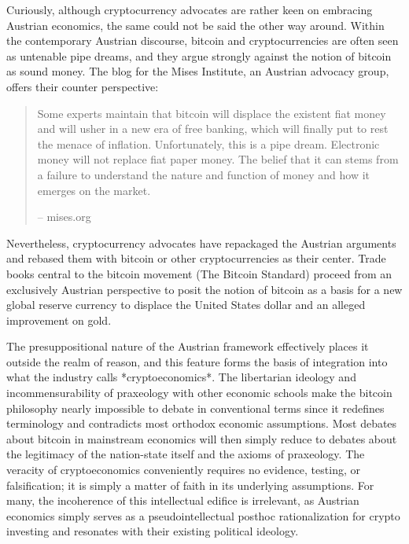 Curiously, although cryptocurrency advocates are rather keen on embracing
Austrian economics, the same could not be said the other way around. Within the
contemporary Austrian discourse, bitcoin and cryptocurrencies are often seen as
untenable pipe dreams, and they argue strongly against the notion of bitcoin as
sound money. The blog for the Mises Institute, an Austrian advocacy group,
offers their counter perspective:


\begin{quote}
Some experts maintain that bitcoin will displace the existent fiat money
and will usher in a new era of free banking, which will finally put to
rest the menace of inflation. Unfortunately, this is a pipe dream.
Electronic money will not replace fiat paper money. The belief that it
can stems from a failure to understand the nature and function of money
and how it emerges on the market.
\begin{flushright}
-- mises.org
\end{flushright}
\end{quote}

Nevertheless, cryptocurrency advocates have repackaged the Austrian arguments
and rebased them with bitcoin or other cryptocurrencies as their center. Trade
books central to the bitcoin movement (The Bitcoin Standard) proceed from an
exclusively Austrian perspective to posit the notion of bitcoin as a basis for a
new global reserve currency to displace the United States dollar and an alleged
improvement on gold.

The presuppositional nature of the Austrian framework effectively places it
outside the realm of reason, and this feature forms the basis of integration
into what the industry calls *cryptoeconomics*. The libertarian ideology and
incommensurability of praxeology with other economic schools make the bitcoin
philosophy nearly impossible to debate in conventional terms since it redefines
terminology and contradicts most orthodox economic assumptions. Most debates
about bitcoin in mainstream economics will then simply reduce to debates about
the legitimacy of the nation-state itself and the axioms of praxeology. The
veracity of cryptoeconomics conveniently requires no evidence, testing, or
falsification; it is simply a matter of faith in its underlying assumptions. For
many, the incoherence of this intellectual edifice is irrelevant, as Austrian
economics simply serves as a pseudointellectual posthoc rationalization for
crypto investing and resonates with their existing political ideology.

